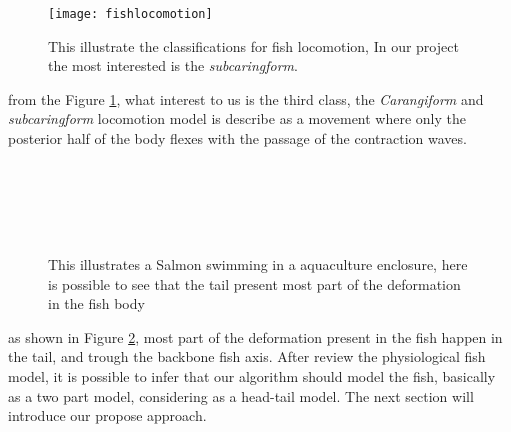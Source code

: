 \begin{figure}
\label{fig:fishlocomotion}
\centering     %
\texttt{[image: fishlocomotion]}
\caption[]{This illustrate the classifications for fish locomotion, In our project
the most interested is the \textit{subcaringform}.\footnotemark{}}
\end{figure}

from the Figure \ref{fig:fishlocomotion}, what interest to us is the third class, the 
\textit{Carangiform} and \textit{subcaringform} locomotion model is describe as a movement
where only the posterior half of the body flexes with the passage of the contraction waves.


\begin{figure}
\begin{adjustwidth}{-1in}{-1in} 
\label{fig:fishswimming}
\centering     %
{} \\
 \\
 \\
 \\
\caption{This illustrates a Salmon swimming in a aquaculture enclosure, here is possible to 
see that the tail present most part of the deformation in the fish body}
\end{adjustwidth}
\end{figure}


as shown in Figure \ref{fig:fishswimming}, most part of the deformation present in the fish
happen in the tail, and trough the backbone fish axis.
After review the physiological fish model, it is possible to infer that our algorithm
should model the fish, basically as a two part model, considering as a head-tail model.
The next section will introduce our propose approach.

